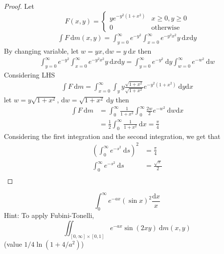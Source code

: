 \begin{proof}
  Let 
  \[
    F(x, y) = \begin{cases}
      ye^{-y^2(1+x^2)} & x \ge 0, y \ge 0 \\
      0 & \text{otherwise}
    \end{cases}
  \]
  \begin{align*}
    \int F \ \mathrm{d}m(x, y) = \int_{y=0}^\infty e^{-y^2}\int_{x=0}^\infty e^{-y^2x^2}y \ \mathrm{d}x\mathrm{d}y
  \end{align*}
  By changing variable, let $w = yx, \mathrm{d}w = y \ \mathrm{d}x$ then
  \begin{align*}
    \int_{y=0}^\infty e^{-y^2}\int_{x=0}^\infty e^{-y^2x^2}y \ \mathrm{d}x\mathrm{d}y = \int_{y=0}^\infty e^{-y^2}\ \mathrm{d}y \int_{w=0}^\infty e^{-w^2} \ \mathrm{d}w
  \end{align*}
  Considering LHS
  \begin{align*}
    \int F\ \mathrm{d}m = \int_{x=0}^\infty \int_y y \frac{\sqrt{1+x^2}}{\sqrt{1+x^2}} e^{-y^2(1+x^2)} \ \mathrm{d}y\mathrm{d}x 
  \end{align*}
  let $w = y \sqrt{1+x^2}$, $\mathrm{d}w = \sqrt{1+x^2} \ \mathrm{d}y$ then
  \begin{align*}
    \int F \ \mathrm{d}m &= \int_0^\infty \frac{1}{1+x^2} \int_0^\infty \frac{2w}2 e^{-w^2} \ \mathrm{d}w \mathrm{d}x \\
    &= \frac12 \int_0^\infty \frac1{1+x^2}\ \mathrm{d}x = \frac\pi4
  \end{align*}
  Considering the first integration and the second integration, we get that
  \begin{align*}
    \left(\int_0^\infty e^{-s^2} \ \mathrm{d}s\right)^2 &= \frac\pi4 \\
    \int_0^\infty e^{-s^2} \ \mathrm{d}s &= \frac{\sqrt{\pi}}2 \\
  \end{align*}
\end{proof}

\begin{example}
  \[\int_0^\infty e^{-ax} (\sin x)^2 \frac{\mathrm{d}x}x\]
  Hint: To apply Fubini-Tonelli, 
  \[\iint_{[0, \infty]\times[0, 1]} e^{-ax} \sin(2xy) \ \mathrm{d}m(x, y)\]
  (value $1/4 \ln(1+4/a^2)$)
\end{example}
